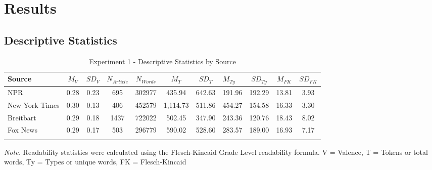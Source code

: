 \documentclass[english,,man]{apa6}
\begin{document}
\hypertarget{results}{%
\section{Results}\label{results}}

\hypertarget{descriptive-statistics}{%
\subsection{Descriptive Statistics}\label{descriptive-statistics}}

\begin{table}[tbp]

\begin{center}
\begin{threeparttable}

\caption{\label{tab:exp1-source-descriptives}Experiment 1 - Descriptive Statistics by Source}

\begin{tabular}{lcccccclccc}
\toprule
Source & $M_V$ & $SD_V$ & $N_{Article}$ & $N_{Words}$ & $M_T$ & $SD_T$ & $M_{Ty}$ & $SD_{Ty}$ & $M_{FK}$ & $SD_{FK}$\\
\midrule
NPR & 0.28 & 0.23 & 695 & 302977 & 435.94 & 642.63 & 191.96 & 192.29 & 13.81 & 3.93\\
New York Times & 0.30 & 0.13 & 406 & 452579 & 1,114.73 & 511.86 & 454.27 & 154.58 & 16.33 & 3.30\\
Breitbart & 0.29 & 0.18 & 1437 & 722022 & 502.45 & 347.90 & 243.36 & 120.76 & 18.43 & 8.02\\
Fox News & 0.29 & 0.17 & 503 & 296779 & 590.02 & 528.60 & 283.57 & 189.00 & 16.93 & 7.17\\
\bottomrule
\addlinespace
\end{tabular}

\begin{tablenotes}[para]
\normalsize{\textit{Note.} Readability statistics were calculated using the Flesch-Kincaid Grade Level readability formula. V = Valence, T = Tokens or total words, Ty = Types or unique words, FK = Flesch-Kincaid}
\end{tablenotes}

\end{threeparttable}
\end{center}

\end{table}
\end{document}
